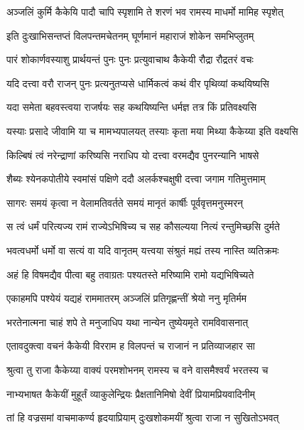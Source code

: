 \twolineshloka
{अञ्जलिं कुर्मि कैकेयि पादौ चापि स्पृशामि ते}
{शरणं भव रामस्य माधर्मो मामिह स्पृशेत्} %

\twolineshloka
{इति दुःखाभिसन्तप्तं विलपन्तमचेतनम्}
{घूर्णमानं महाराजं शोकेन समभिप्लुतम्} %

\twolineshloka
{पारं शोकार्णवस्याशु प्रार्थयन्तं पुनः पुनः}
{प्रत्युवाचाथ कैकेयी रौद्रा रौद्रतरं वचः} %

\twolineshloka
{यदि दत्त्वा वरौ राजन् पुनः प्रत्यनुतप्यसे}
{धार्मिकत्वं कथं वीर पृथिव्यां कथयिष्यसि} %

\twolineshloka
{यदा समेता बहवस्त्वया राजर्षयः सह}
{कथयिष्यन्ति धर्मज्ञ तत्र किं प्रतिवक्ष्यसि} %

\twolineshloka
{यस्याः प्रसादे जीवामि या च मामभ्यपालयत्}
{तस्याः कृता मया मिथ्या कैकेय्या इति वक्ष्यसि} %

\twolineshloka
{किल्बिषं त्वं नरेन्द्राणां करिष्यसि नराधिप}
{यो दत्त्वा वरमद्यैव पुनरन्यानि भाषसे} %

\twolineshloka
{शैब्यः श्येनकपोतीये स्वमांसं पक्षिणे ददौ}
{अलर्कश्चक्षुषी दत्त्वा जगाम गतिमुत्तमाम्} %

\twolineshloka
{सागरः समयं कृत्वा न वेलामतिवर्तते}
{समयं मानृतं कार्षीः पूर्ववृत्तमनुस्मरन्} %

\twolineshloka
{स त्वं धर्मं परित्यज्य रामं राज्येऽभिषिच्य च}
{सह कौसल्यया नित्यं रन्तुमिच्छसि दुर्मते} %

\twolineshloka
{भवत्वधर्मो धर्मो वा सत्यं वा यदि वानृतम्}
{यत्त्वया संश्रुतं मह्यं तस्य नास्ति व्यतिक्रमः} %

\twolineshloka
{अहं हि विषमद्यैव पीत्वा बहु तवाग्रतः}
{पश्यतस्ते मरिष्यामि रामो यद्यभिषिच्यते} %

\twolineshloka
{एकाहमपि पश्येयं यद्यहं राममातरम्}
{अञ्जलिं प्रतिगृह्णन्तीं श्रेयो ननु मृतिर्मम} %

\twolineshloka
{भरतेनात्मना चाहं शपे ते मनुजाधिप}
{यथा नान्येन तुष्येयमृते रामविवासनात्} %

\twolineshloka
{एतावदुक्त्वा वचनं कैकेयी विरराम ह}
{विलपन्तं च राजानं न प्रतिव्याजहार सा} %

\twolineshloka
{श्रुत्वा तु राजा कैकेय्या वाक्यं परमशोभनम्}
{रामस्य च वने वासमैश्वर्यं भरतस्य च} %

\twolineshloka
{नाभ्यभाषत कैकेयीं मुहूर्तं व्याकुलेन्द्रियः}
{प्रैक्षतानिमिषो देवीं प्रियामप्रियवादिनीम्} %

\twolineshloka
{तां हि वज्रसमां वाचमाकर्ण्य हृदयाप्रियाम्}
{दुःखशोकमयीं श्रुत्वा राजा न सुखितोऽभवत्} %

